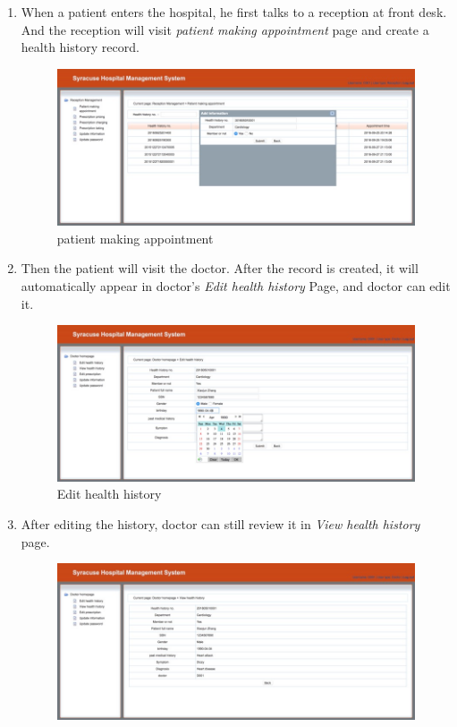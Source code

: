\begin{enumerate}
    \item When a patient enters the hospital, he first talks to a reception at front desk. And the reception will visit \emph{patient making appointment} page and create a health history record.
    \begin{figure}[H]
    \centering
    \includegraphics[width=\textwidth]{pp/pp2.jpg}
    \caption{patient making appointment}
    \label{fig:pp2}
\end{figure}
    \item Then the patient will visit the doctor. After the record is created, it will automatically appear in doctor’s \emph{Edit health history} Page, and doctor can edit it.
    \begin{figure}[H]
    \centering
    \includegraphics[width=\textwidth]{pp/pp3.jpg}
    \caption{Edit health history}
    \label{fig:pp3}
\end{figure}
    \item After editing the history, doctor can still review it in \emph{View health history} page.
    \begin{figure}[H]
    \centering
    \includegraphics[width=\textwidth]{pp/pp4.jpg}

\end{figure}
\end{enumerate}
